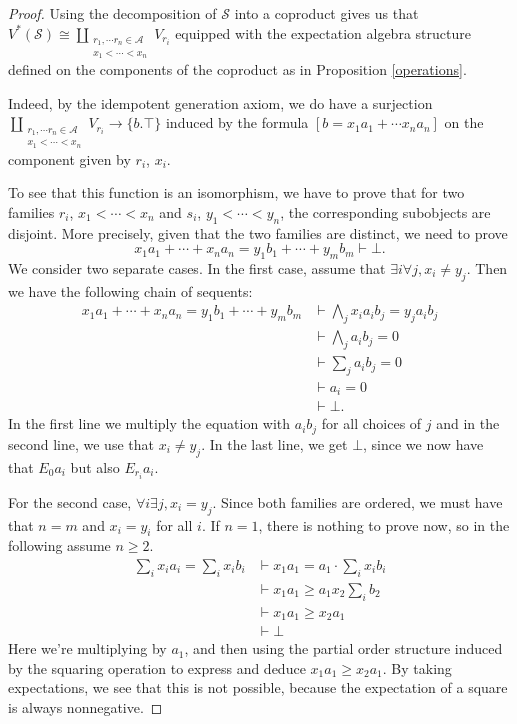 \documentclass[a4paper]{amsproc}
\theoremstyle{plain}
\theoremstyle{definition}
\theoremstyle{remark}
\numberwithin{equation}{section}
\begin{document}
\begin{proof}
    Using the decomposition of $\mathcal{S}$ into a coproduct gives us that $V^*(\mathcal{S}) \cong \coprod_{\substack{r_1, \cdots r_n \in \mathcal{A} \\ x_1 < \cdots < x_n}} V_{r_i}$ equipped with the expectation algebra structure defined on the components of the coproduct as in Proposition \ref{operations}.

    Indeed, by the idempotent generation axiom, we do have a surjection $\coprod_{\substack{r_1, \cdots r_n \in \mathcal{A} \\ x_1 < \cdots < x_n}} V_{r_i} \to \{ b . \top \}$ induced by the formula $[b = x_1 a_1 + \cdots x_n a_n]$ on the component given by $r_i$, $x_i$.

    To see that this function is an isomorphism, we have to prove that for two families $r_i$, $x_1< \cdots <x_n$ and $s_i$, $y_1 < \cdots < y_n$, the corresponding subobjects are disjoint. More precisely, given that the two families are distinct, we need to prove
    \[
        x_1 a_1 + \cdots + x_n a_n = y_1 b_1 + \cdots + y_m b_m \vdash \bot .
    \]
    We consider two separate cases. In the first case, assume that $\exists i \forall j, x_i \ne y_j$. Then we have the following chain of sequents:
    \begin{align*}
        x_1 a_1 + \cdots + x_n a_n = y_1 b_1 + \cdots + y_m b_m &\vdash \bigwedge_j x_i a_i b_j = y_j a_i b_j \\
        &\vdash \bigwedge_j a_i b_j = 0 \\
        &\vdash \sum_j a_i b_j = 0 \\
        &\vdash a_i = 0 \\
        &\vdash \bot .
    \end{align*}
    In the first line we multiply the equation with $a_i b_j$ for all choices of $j$ and in the second line, we use that $x_i \ne y_j$. In the last line, we get $\bot$, since we now have that $E_0 a_i$ but also $E_{r_i} a_i$.

    For the second case, $\forall i \exists j, x_i = y_j$. Since both families are ordered, we must have that $n = m$ and $x_i = y_i$ for all $i$. If $n = 1$, there is nothing to prove now, so in the following assume $n \ge 2$.
    \begin{align*}
        \sum_i x_i a_i = \sum_i x_i b_i &\vdash x_1 a_1 = a_1 \cdot \sum_i x_i b_i \\
        &\vdash x_1 a_1 \ge a_1 x_2 \sum_i b_2 \\
        &\vdash x_1 a_1 \ge x_2 a_1 \\
        &\vdash \bot
    \end{align*}
    Here we're multiplying by $a_1$, and then using the partial order structure induced by the squaring operation to express and deduce $x_1 a_1 \ge x_2 a_1$. By taking expectations, we see that this is not possible, because the expectation of a square is always nonnegative.
    

\end{proof}
\end{document}
